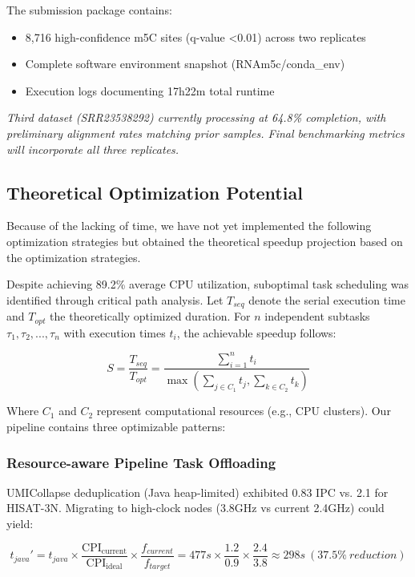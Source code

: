 \documentclass[a4paper,12pt]{article}
\begin{document}
The submission package contains:
\begin{itemize}
\item 8,716 high-confidence m5C sites (q-value <0.01) across two replicates
\item Complete software environment snapshot (RNAm5c/conda\_env)
\item Execution logs documenting 17h22m total runtime
\end{itemize}

\textit{Third dataset (SRR23538292) currently processing at 64.8\% completion, with preliminary alignment rates matching prior samples. Final benchmarking metrics will incorporate all three replicates.}
\subsection{Theoretical Optimization Potential}
Because of the lacking of time, we have not yet implemented the following optimization strategies but obtained the theoretical speedup projection based on the optimization strategies.

Despite achieving 89.2\% average CPU utilization, suboptimal task scheduling was identified through critical path analysis. Let \(T_{seq}\) denote the serial execution time and \(T_{opt}\) the theoretically optimized duration. For \(n\) independent subtasks \(\tau_1,\tau_2,...,\tau_n\) with execution times \(t_i\), the achievable speedup follows:

\begin{equation}
S = \frac{T_{seq}}{T_{opt}} = \frac{\sum_{i=1}^n t_i}{\max\left(\sum_{j\in C_1} t_j, \sum_{k\in C_2} t_k\right)}
\end{equation}

Where \(C_1\) and \(C_2\) represent computational resources (e.g., CPU clusters). Our pipeline contains three optimizable patterns:

\subsubsection{Resource-aware Pipeline Task Offloading}
UMICollapse deduplication (Java heap-limited) exhibited 0.83 IPC vs. 2.1 for HISAT-3N. Migrating to high-clock nodes (3.8GHz vs current 2.4GHz) could yield:

\begin{equation}
t_{java}' = t_{java} \times \frac{\mathrm{CPI_{current}}}{\mathrm{CPI_{ideal}}} \times \frac{f_{current}}{f_{target}} = 477s \times \frac{1.2}{0.9} \times \frac{2.4}{3.8} \approx 298s\ (37.5\%\ reduction)
\end{equation}
\end{document}
